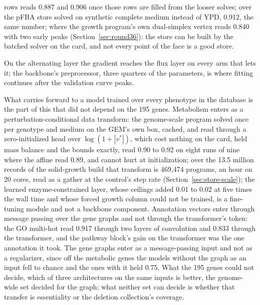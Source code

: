 \begin{description}
    rows reads 0.887 and 0.906 once those rows are filled from the looser solves;
    over the pFBA store solved on synthetic complete medium instead of
    YPD, 0.912, the same number; where the growth
    program's own dual-simplex vertex reads 0.840 with two early peaks
    (Section~\ref{sec:round36}): the store can be built by the batched solver on the
    card, and not every point of the face is a good store.
  \item[Where the gradient goes is not the problem.] On the alternating layer the
    gradient reaches the flux layer on every arm that lets it; the backbone's
    preprocessor, three quarters of the parameters, is where fitting continues after the
    validation curve peaks.
\end{description}

What carries forward to a model trained over every phenotype in the database is the
part of this that did not depend on the 195 genes. Metabolism enters as a
perturbation-conditional data transform: the genome-scale program solved once per
genotype and medium on the GEM's own box, cached, and read through a zero-initialized
head over $\log(1 + |v^*|)$, which cost nothing on the card, held mass balance and the
bounds exactly, read 0.90 to 0.92 on eight runs of nine where the affine read 0.89, and
cannot hurt at initialization; over the 13.5 million records of the solid-growth build
that transform is 469,474 programs, an hour on 20 cores, read as a gather at the
control's step rate (Section~\ref{sec:store-scale}); the learned enzyme-constrained layer, whose ceilings
added 0.01 to 0.02 at five times the wall time and whose forced growth column could
not be trained, is a fine-tuning module and not a backbone component. Annotation
vectors enter through message passing over the gene graphs and not through the
transformer's token: the GO multi-hot read 0.917 through two layers of convolution
and 0.833 through the transformer, and the pathway block's gain on the transformer
was the one annotation it took. The gene graphs enter as a message-passing input and
not as a regularizer, since off the metabolic genes the models without the graph as
an input fell to chance and the ones with it held 0.75. What the 195 genes could not
decide, which of three architectures on the same inputs is better, the genome-wide
set decided for the graph; what neither set can decide is whether that transfer is
essentiality or the deletion collection's coverage.
